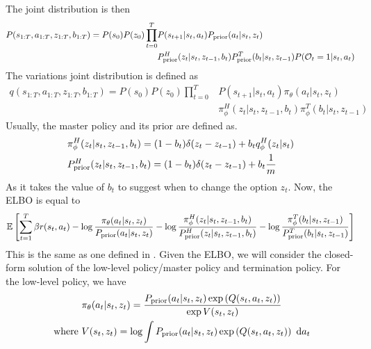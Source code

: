 The joint distribution is then 
\begin{equation}
\begin{aligned}
    P(s_{1:T}, a_{1:T}, z_{1:T}, b_{1:T}) = P(s_0)P(z_0)\prod^T_{t=0} &P(s_{t+1} | s_t, a_t) P_{\text{prior}}(a_t | s_t, z_t)\\
    &P_{\text{prior}}^H(z_t | s_t, z_{t-1}, b_t) P_{\text{prior}}^T(b_t | s_t, z_{t-1}) P(\mathcal{O}_t = 1 | s_t, a_t)
 \end{aligned}
\end{equation}
The variations joint distribution is defined as 
\begin{equation}
\begin{aligned}
    q(s_{1:T}, a_{1:T}, z_{1:T}, b_{1:T}) = P(s_0)P(z_0)\prod^T_{t=0} &P(s_{t+1} | s_t, a_t) \pi_{\theta}(a_t | s_t, z_t)\\
    &\pi^H_{\phi}(z_t | s_t, z_{t-1}, b_t) \pi^T_{\phi}(b_t | s_t, z_{t-1}) 
\end{aligned}
\end{equation}
Usually, the master policy and its prior are defined as. 
\begin{equation}
\begin{aligned}
    &\pi^H_{\phi}(z_t | s_t, z_{t-1}, b_t) = (1-b_t) \delta(z_t  - z_{t-1}) + b_t q^H_{\phi}(z_t | s_t) \\ 
    &P_{\text{prior}}^H(z_t | s_t, z_{t-1}, b_t) = (1-b_t) \delta(z_t  - z_{t-1}) + b_t \frac{1}{m}
\end{aligned}
\end{equation}
As it takes the value of $b_t$ to suggest when to change the option $z_t$. Now, the ELBO is equal to 
\begin{equation}
    \mathbb{E}\left[ \sum^T_{t=1} \beta r(s_t, a_t) - \log \frac{\pi_{\theta}(a_t | s_t, z_t)}{P_{\text{prior}}(a_t | s_t, z_t)}  - \log \frac{\pi^H_{\phi}(z_t | s_t, z_{t-1}, b_t)}{P_{\text{prior}}^H(z_t | s_t, z_{t-1}, b_t)} - \log \frac{\pi^T_{\phi}(b_t | s_t, z_{t-1}) }{P_{\text{prior}}^T(b_t | s_t, z_{t-1})} \right]
\end{equation}
This is the same as one defined in \cite{igl2019multitask}. Given the ELBO, we will consider the closed-form solution of the low-level policy/master policy and termination policy. For the low-level policy, we have 
\begin{equation}
\begin{aligned}
    &\pi_{\theta}(a_{t} | s_{t}, z_{t}) = \frac{P_{\text{prior}}(a_{t} | s_{t}, z_{t})\exp\left( Q(s_{t}, a_{t}, z_{t}) \right)}{\exp V(s_{t}, z_{t})} \\
    \text{ where }&V(s_{t}, z_{t}) = \log \int P_{\text{prior}}(a_{t} | s_{t}, z_{t})\exp\left( Q(s_{t}, a_{t}, z_{t}) \right) \ \mathrm{d} a_{t}
\end{aligned}
\end{equation}
